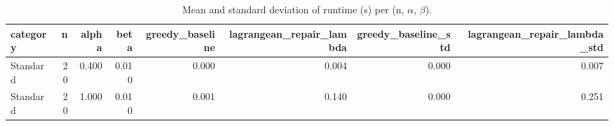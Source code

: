 \begin{table}
\caption{Mean and standard deviation of runtime (s) per (n, $\alpha$, $\beta$).}
\label{tab:runtime_pivot}
\begin{tabular}{lrrrrrrr}
\toprule
category & n & alpha & beta & greedy\_baseline & lagrangean\_repair\_lambda & greedy\_baseline\_std & lagrangean\_repair\_lambda\_std \\
\midrule
Standard & 20 & 0.400 & 0.010 & 0.000 & 0.004 & 0.000 & 0.007 \\
Standard & 20 & 1.000 & 0.010 & 0.001 & 0.140 & 0.000 & 0.251 \\
\bottomrule
\end{tabular}
\end{table}
